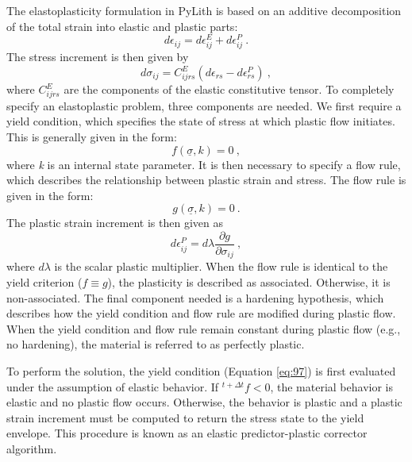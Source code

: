 The elastoplasticity formulation in PyLith is based on an additive
decomposition of the total strain into elastic and plastic parts:
\begin{equation}
d\epsilon_{ij}=d\epsilon_{ij}^{E}+d\epsilon_{ij}^{P}\:.\label{eq:95}
\end{equation}
The stress increment is then given by
\begin{equation}
d\sigma_{ij}=C_{ijrs}^{E}\left(d\epsilon_{rs}-d\epsilon_{rs}^{P}\right)\:,\label{eq:96}
\end{equation}
where $C_{ijrs}^{E}$ are the components of the elastic constitutive
tensor. To completely specify an elastoplastic problem, three components
are needed. We first require a yield condition, which specifies the
state of stress at which plastic flow initiates. This is generally
given in the form:
\begin{equation}
f\left(\underline{\sigma},k\right)=0\:,\label{eq:97}
\end{equation}
where \textit{k} is an internal state parameter. It is then necessary
to specify a flow rule, which describes the relationship between plastic
strain and stress. The flow rule is given in the form:
\begin{equation}
g\left(\underline{\sigma},k\right)=0\:.\label{eq:98}
\end{equation}
The plastic strain increment is then given as
\begin{equation}
d\epsilon_{ij}^{P}=d\lambda\frac{\partial g}{\partial\sigma_{ij}}\:,\label{eq:99}
\end{equation}
where $d\lambda$ is the scalar plastic multiplier. When the flow
rule is identical to the yield criterion ($f\equiv g$), the plasticity
is described as associated. Otherwise, it is non-associated. The final
component needed is a hardening hypothesis, which describes how the
yield condition and flow rule are modified during plastic flow. When
the yield condition and flow rule remain constant during plastic flow
(e.g., no hardening), the material is referred to as perfectly plastic.

To perform the solution, the yield condition (Equation \ref{eq:97})
is first evaluated under the assumption of elastic behavior. If $^{t+\Delta t}f<0$,
the material behavior is elastic and no plastic flow occurs. Otherwise,
the behavior is plastic and a plastic strain increment must be computed
to return the stress state to the yield envelope. This procedure is
known as an elastic predictor-plastic corrector algorithm.


